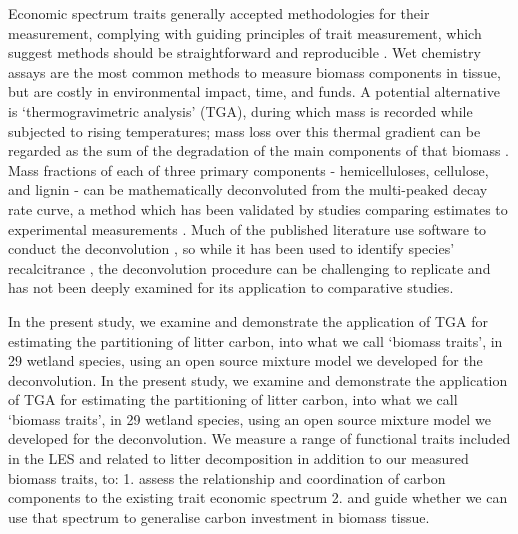 \documentclass{article}
\begin{document}
Economic spectrum traits generally accepted methodologies for their measurement, complying with guiding principles of trait measurement, which suggest methods should be straightforward and reproducible \citep{perez-harguindeguy2013}. Wet chemistry assays are the most common methods to measure biomass components in tissue, but are costly in environmental impact, time, and funds. A potential alternative is `thermogravimetric analysis’ (TGA), during which mass is recorded while subjected to rising temperatures; mass loss over this thermal gradient can be regarded as the sum of the degradation of the main components of that biomass \citep{hu2016,barneto2009,yang2006,cheng2015,perejon2011,orfao2001chen2017,muller-hagedorn2007}. Mass fractions of each of three primary components - hemicelluloses, cellulose, and lignin - can be mathematically deconvoluted from the multi-peaked decay rate curve, a method which has been validated by studies comparing estimates to experimental measurements \citep{yang2006,barneto2009}. Much of the published literature use software to conduct the deconvolution \citetext{for example OriginPro \citealp{chen2017}, PeakFit \citealp{strandberg2017,perejon2011}, Fityk \citealp{perejon2011}, or Datafit \citealp{cheng2015}}, so while it has been used to identify species' recalcitrance \citetext{for example in seagrasses \citealp{trevathan-tackett2015}, and eucaplyts \citealp{orfao2001}}, the deconvolution procedure can be challenging to replicate and has not been deeply examined for its application to comparative studies. 

In the present study, we examine and demonstrate the application of TGA for estimating the partitioning of litter carbon, into what we call ‘biomass traits’, in 29 wetland species, using an open source mixture model we developed for the deconvolution. In the present study, we examine and demonstrate the application of TGA for estimating the partitioning of litter carbon, into what we call ‘biomass traits’, in 29 wetland species, using an open source mixture model we developed for the deconvolution. We measure a range of functional traits included in the LES and related to litter decomposition in addition to our measured biomass traits, to: 
1.	assess the relationship and coordination of carbon components to the existing trait economic spectrum
2.	and guide whether we can use that spectrum to generalise carbon investment in biomass tissue.
\end{document}

